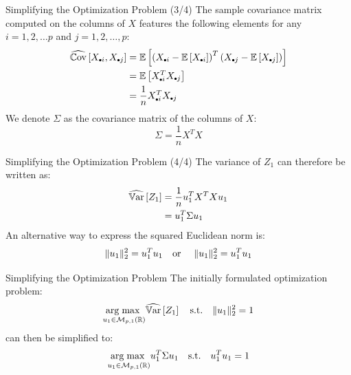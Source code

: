 \begin{frame}{Simplifying the Optimization Problem (3/4)}
	The sample covariance matrix computed on the columns of $X$ features the following elements for any $i=1, 2, \dots p$ and $j=1, 2, \dots, p$:
	\begin{equation}
		\begin{aligned}
			\Covhat{X_{\bigdot i}, X_{\bigdot j}} 
			&= \E{\left(X_{\bigdot i} - \E{X_{\bigdot i}}\right)^T \left(X_{\bigdot j} - \E{X_{\bigdot j}}\right)} \\
			&= \E{X_{\bigdot i}^T X_{\bigdot j}} \\
			&= \frac{1}{n} X_{\bigdot i}^T X_{\bigdot j}
		\end{aligned}
		\nonumber
	\end{equation}
	\pause
	We denote $\Sigma$ as the covariance matrix of the columns of $X$:
	\begin{equation}
		\Sigma = \frac{1}{n} X^T X
		\nonumber
	\end{equation}
\end{frame}

\begin{frame}{Simplifying the Optimization Problem (4/4)}
	The variance of $Z_1$ can therefore be written as:
	\begin{equation}
		\begin{aligned}
			\widehat{\operatorname{\mathbb{V}ar}}\left[Z_1\right] 
			&= \frac{1}{n} u_1^T X^T X u_1 \\
			&= u_1^T \Sigma u_1
		\end{aligned}
		\nonumber
	\end{equation}	
	\pause
	An alternative way to express the squared Euclidean norm is:
	\begin{equation}
		\|u_1\|_2^2 = u_1^T u_1
		\text{\quad or \quad} \|u_1\|_2^2 = u_1^T u_1
		\nonumber
	\end{equation}
\end{frame}

\begin{frame}{Simplifying the Optimization Problem}
	The initially formulated optimization problem:
	\begin{equation}
		\underset{u_1 \in \mathcal{M}_{p,1}(\mathbb{R})}{\operatorname{arg\;max}\;} \widehat{\operatorname{\mathbb{V}ar}}\left[Z_1\right] \quad \text{s.t.} \quad \|u_1\|_2^2 = 1
		\nonumber
	\end{equation}
	\pause
	can then be simplified to:
	\begin{equation}
		\underset{u_1 \in \mathcal{M}_{p,1}(\mathbb{R})}{\operatorname{arg\;max}\;} u_1^T \Sigma u_1 \quad \text{s.t.} \quad u_1^T u_1 = 1
		\nonumber
	\end{equation}
\end{frame}

